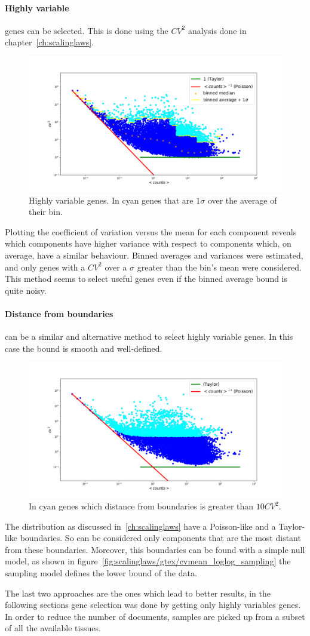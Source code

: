 \paragraph{Highly variable} genes can be selected. This is done using the $CV^2$ analysis done in chapter~\ref{ch:scalinglaws}.
\begin{figure}[htb!]
    \centering
    \includegraphics[width=0.8\linewidth]{pictures/topic/cvmean_oversigma.png}
    \caption{Highly variable genes. In cyan genes that are $1 \sigma$ over the average of their bin.}
    \label{fig:topic/cvmean_oversigma}
\end{figure}
Plotting the coefficient of variation versus the mean for each component reveals which components have higher variance with respect to components which, on average, have a similar behaviour. Binned averages and variances were estimated, and only genes with a $CV^2$ over a $\sigma$ greater than the bin's mean were considered. This method seems to select useful genes even if the binned average bound is quite noisy.

\paragraph{Distance from boundaries} can be a similar and alternative method to select highly variable genes. In this case the bound is smooth and well-defined.
\begin{figure}[htb!]
    \centering
    \includegraphics[width=0.8\linewidth]{pictures/topic/cvmean_oversampling.png}
    \caption{In cyan genes which distance from boundaries is greater than $10 CV^2$.}
    \label{fig:topic/cvmean_oversampling}
\end{figure}
The distribution as discussed in~\ref{ch:scalinglaws} have a Poisson-like and a Taylor-like boundaries. So can be considered only components that are the most distant from these boundaries. Moreover, this boundaries can be found with a simple null model, as shown in figure~\ref{fig:scalinglaws/gtex/cvmean_loglog_sampling} the sampling model defines the lower bound of the data.

The last two approaches are the ones which lead to better results, in the following sections gene selection was done by getting only highly variables genes.
In order to reduce the number of documents, samples are picked up from a subset of all the available tissues.